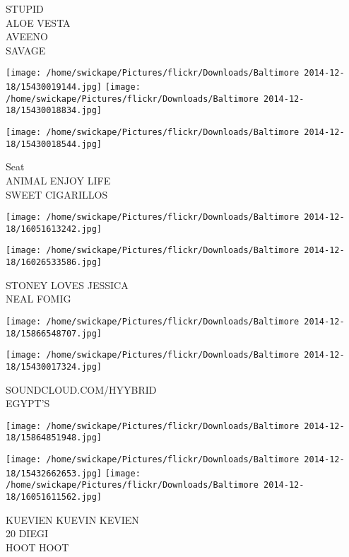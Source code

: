 \documentclass[10pt,letterpaper]{article}
\begin{document}
STUPID\\
ALOE VESTA\\
AVEENO\\
SAVAGE\\
\pagebreak

\texttt{[image: /home/swickape/Pictures/flickr/Downloads/Baltimore 2014-12-18/15430019144.jpg]}
\texttt{[image: /home/swickape/Pictures/flickr/Downloads/Baltimore 2014-12-18/15430018834.jpg]}

\texttt{[image: /home/swickape/Pictures/flickr/Downloads/Baltimore 2014-12-18/15430018544.jpg]}

Seat\\
ANIMAL ENJOY LIFE\\
SWEET CIGARILLOS\\
\pagebreak

\texttt{[image: /home/swickape/Pictures/flickr/Downloads/Baltimore 2014-12-18/16051613242.jpg]}

\vspace{0.25in}
\texttt{[image: /home/swickape/Pictures/flickr/Downloads/Baltimore 2014-12-18/16026533586.jpg]}

STONEY LOVES JESSICA\\
NEAL FOMIG\\
\pagebreak

\texttt{[image: /home/swickape/Pictures/flickr/Downloads/Baltimore 2014-12-18/15866548707.jpg]}

\vspace{0.25in}
\texttt{[image: /home/swickape/Pictures/flickr/Downloads/Baltimore 2014-12-18/15430017324.jpg]}

SOUNDCLOUD.COM/HYYBRID\\
EGYPT'S\\
\pagebreak

\texttt{[image: /home/swickape/Pictures/flickr/Downloads/Baltimore 2014-12-18/15864851948.jpg]}

\vspace{0.25in}
\texttt{[image: /home/swickape/Pictures/flickr/Downloads/Baltimore 2014-12-18/15432662653.jpg]}
\texttt{[image: /home/swickape/Pictures/flickr/Downloads/Baltimore 2014-12-18/16051611562.jpg]}

KUEVIEN KUEVIN KEVIEN\\
20 DIEGI\\
HOOT HOOT\\
\pagebreak
\end{document}
